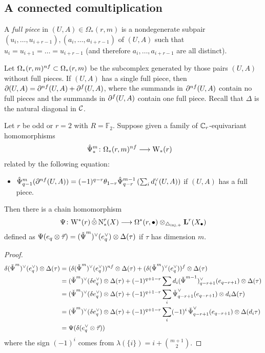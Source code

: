 \subsection{A connected comultiplication} A \emph{full piece} in $(U,A)\in \Omega_*(r,m)$ is a nondegenerate subpair $(u_i,\ldots,u_{i+r-1}),(a_i,\ldots,a_{i+r-1})$ of $(U,A)$ such that $u_i = u_{i+1} = \ldots = u_{i+r-1}$ (and therefore $a_i,\ldots,a_{i+r-1}$ are all distinct).

Let $\Omega_*(r,m)^{nf}\subset \Omega_*(r,m)$ be the subcomplex generated by those pairs $(U,A)$ without full pieces. If $(U,A)$ has a single full piece, then $\partial(U,A) = \partial^{nf}(U,A) + \partial^{f}(U,A)$, where the summands in $\partial^{nf}(U,A)$ contain no full pieces and the summands in $\partial^{f}(U,A)$ contain one full piece. Recall that $\Delta$ is the natural diagonal in $\mathcal{C}$.

\begin{proposition} \label{prop:omegarm}
	Let $r$ be odd or $r=2$ with $R=\mathbb{F}_2$. Suppose given a family of $\mathbb{C}_r$-equivariant homomorphisms
	\begin{align*}
		\hat{\Psi}_*^m\colon \Omega_*(r,m)^{nf}&\longrightarrow \mathrm{W}_*(r)
	\end{align*}
	related by the following equation:
	\begin{itemize}
		\item \label{it:1a}
		$\hat{\Psi}^m_{q-1}(\partial^{nf} (U,A)) = (-1)^{q-r}\theta_{1-r}\hat{\Psi}^{m-1}_{q-r}\left(\sum_i d_i^\vee(U,A)\right)$
		if $(U,A)$ has a full piece.
	\end{itemize}
	Then there is a chain homomorphism
	\[
	\Psi\colon \mathrm{W}^*(r)\operatorname{\hat{\otimes}} \operatorname{N}^r_*(X)\longrightarrow \Omega^*(r,\bullet)\otimes_{\triangle_{\mathrm{inj},+}} \operatorname{\mathbf{L}}^r(X_\bullet)
	\]
	defined as $\Psi(e_q\otimes \vec{\tau}) = (\operatorname{\check{\Psi}}^m)^\vee(e_q^\vee)\otimes \Delta(\tau)$ if $\tau$ has dimension $m$.
\end{proposition}
\def\diaglin{\Delta}

\begin{proof}
	\begin{align*}
		\delta(\Psiom^m)^{\vee}(e_q^\vee)\otimes \diaglin(\tau)
		&= (\delta(\Psiom^m)^{\vee}(e_q^\vee))^{\nf}\otimes\diaglin(\tau) + (\delta(\Psiom^m)^{\vee}(e_q^\vee))^{\f}\otimes\diaglin(\tau) \\
		&= (\Psiom^m)^{\vee}(\delta e_q^\vee)\otimes \diaglin(\tau) + (-1)^{q+1-r}\sum d_i(\Psiom^{m-1})^\vee_{q-r+1}(e_{q-r+1})\otimes\diaglin(\tau) \\
		&= (\Psiom^m)^{\vee}(\delta e_q^\vee)\otimes \diaglin(\tau) + (-1)^{q+1-r}\sum_i \Psiom^\vee_{q-r+1}(e_{q-r+1})\otimes d_i\diaglin(\tau) \\
		&= (\Psiom^m)^{\vee}(\delta e_q^\vee)\otimes \diaglin(\tau) + (-1)^{q+1-r}\sum_i (-1)^i\Psiom^\vee_{q-r+1}(e_{q-r+1})\otimes \diaglin(d_i\tau) \\
		&= \Psi(\delta(e_q^\vee\otimes \vec{\tau}))
	\end{align*}
	where the sign $(-1)^i$ comes from $\lambda(\{i\}) = i + \binom{m+1}{2}$.
\end{proof}


